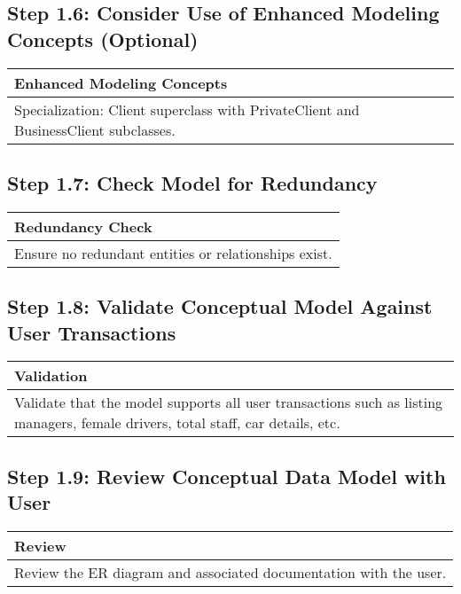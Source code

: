 \documentclass[a4paper,12pt]{article}
\begin{document}
\subsection*{Step 1.6: Consider Use of Enhanced Modeling Concepts (Optional)}
\begin{table}[H]
\centering
\begin{tabularx}{\textwidth}{|X|}
\hline
\rowcolor{blue!20} \textbf{Enhanced Modeling Concepts} \\
\hline
Specialization: Client superclass with PrivateClient and BusinessClient subclasses. \\
\hline
\end{tabularx}
\end{table}

\subsection*{Step 1.7: Check Model for Redundancy}
\begin{table}[H]
\centering
\begin{tabularx}{\textwidth}{|X|}
\hline
\rowcolor{blue!20} \textbf{Redundancy Check} \\
\hline
Ensure no redundant entities or relationships exist. \\
\hline
\end{tabularx}
\end{table}

\subsection*{Step 1.8: Validate Conceptual Model Against User Transactions}
\begin{table}[H]
\centering
\begin{tabularx}{\textwidth}{|X|}
\hline
\rowcolor{blue!20} \textbf{Validation} \\
\hline
Validate that the model supports all user transactions such as listing managers, female drivers, total staff, car details, etc. \\
\hline
\end{tabularx}
\end{table}

\subsection*{Step 1.9: Review Conceptual Data Model with User}
\begin{table}[H]
\centering
\begin{tabularx}{\textwidth}{|X|}
\hline
\rowcolor{blue!20} \textbf{Review} \\
\hline
Review the ER diagram and associated documentation with the user. \\
\hline
\end{tabularx}
\end{table}
\end{document}
